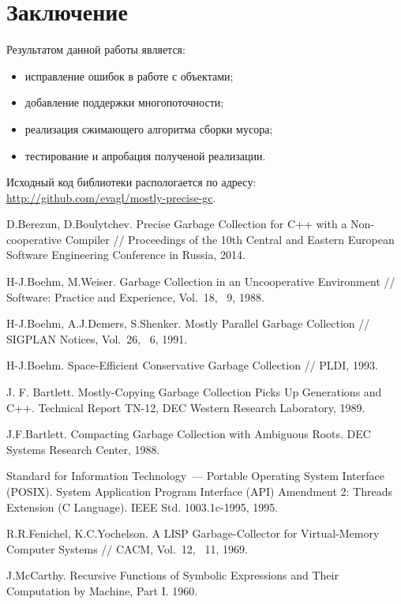 \section*{Заключение}
Результатом данной работы является:

\begin{itemize}
\item исправление ошибок в работе с объектами; 
\item добавление поддержки многопоточности;
\item реализация сжимающего алгоритма сборки мусора;
\item тестирование и апробация полученой реализации.
\end{itemize}

Исходный код библиотеки распологается по адресу: \url{http://github.com/evagl/mostly-precise-gc}.

\begin{thebibliography}{99}
 D.Berezun, D.Boulytchev. Precise Garbage Collection for C++ with a Non-cooperative Compiler //
 Proceedings of the 10th Central and Eastern European Software Engineering Conference in Russia, 2014.

 H-J.Boehm, M.Weiser. Garbage Collection in an Uncooperative Environment //
 Software: Practice and Experience, Vol.~18, \textnumero~9, 1988.

 H-J.Boehm, A.J.Demers, S.Shenker. Mostly Parallel Garbage Collection //
 SIGPLAN Notices, Vol.~26, \textnumero~6, 1991.

 H-J.Boehm. Space-Efficient Conservative Garbage Collection // 
 PLDI, 1993.

 J. F. Bartlett. Mostly-Copying Garbage Collection Picks Up Generations and C++.
 Technical Report TN-12, DEC Western Research Laboratory, 1989.

 J.F.Bartlett. Compacting Garbage Collection with Ambiguous Roots. DEC Systems Research Center,
 1988.

 Standard for Information Technology~--- Portable Operating System Interface (POSIX). 
 System Application Program Interface (API) Amendment 2: Threads Extension (C Language).
 IEEE Std. 1003.1c-1995, 1995.

 R.R.Fenichel, K.C.Yochelson.
 A LISP Garbage-Collector for Virtual-Memory Computer Systems //
 CACM, Vol.~12, \textnumero~11, 1969.

 J.McCarthy. Recursive Functions of Symbolic Expressions and Their Computation by Machine, Part I.
 1960.
\end{thebibliography}
